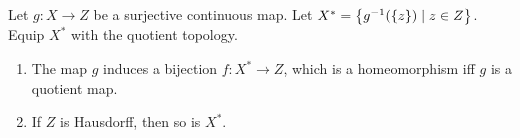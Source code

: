 \begin{cl}
    Let $g: X\to Z$ be a surjective continuous map. Let $X^* = {\left\{{g^{-1}({\left\{{z}\right\}}) \mid z\in Z}\right\}}$. Equip $X^*$ with the quotient topology. 
    \begin{enumerate}[label={(\alph*)}]
        \item The map $g$ induces a bijection $f: X^*\to Z$, which is a homeomorphism iff $g$ is a quotient map.
        \item If $Z$ is Hausdorff, then so is $X^*$.
    \end{enumerate}
\end{cl}